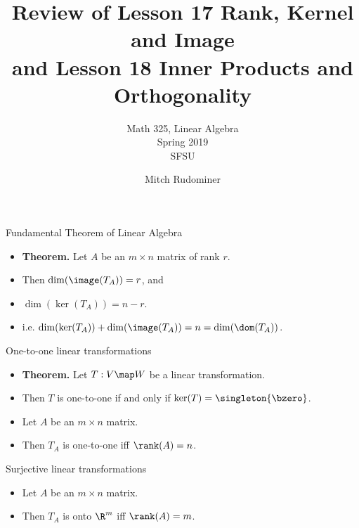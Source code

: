 \documentclass{beamer}
\title{Review of Lesson 17 Rank, Kernel and Image \\ and Lesson 18 Inner Products and Orthogonality}
\subtitle{Math 325, Linear Algebra \\ Spring 2019 \\ SFSU}
\author{Mitch Rudominer}
\date{}
\begin{document}
\begin{frame}
  \titlepage
\end{frame}

\begin{frame}{Fundamental Theorem of Linear Algebra }
\begin{itemize}
\item \textbf{Theorem.} Let $A$ be an $m\times n$ matrix of rank $r$.
\item Then $\dim(\image(T_A)) = r$, and
\item $\dim(\ker(T_A)) = n-r$.
\item i.e. $\dim(\ker(T_A)) + \dim(\image(T_A)) = n = \dim(\dom(T_A))$.
\end{itemize}
\end{frame}


\begin{frame}{One-to-one linear transformations}

\begin{itemize}
\item \textbf{Theorem.} Let $T:V\map W$ be a linear transformation.
\item Then $T$ is one-to-one if and only if $\ker(T) = \singleton{\bzero}$.
\item Let $A$ be an $m\times n$ matrix.
\item Then $T_A$ is one-to-one iff $\rank(A) = n$.
\end{itemize}
\end{frame}


\begin{frame}{Surjective linear transformations}

\begin{itemize}
\item Let $A$ be an $m\times n$ matrix.
\item Then $T_A$ is onto $\R^m$ iff $\rank(A) = m$.
\end{itemize}
\end{frame}


\end{document}
